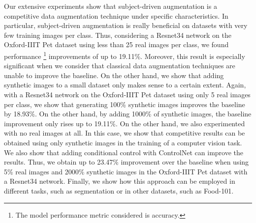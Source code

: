 Our extensive experiments show that subject-driven augmentation is a competitive data augmentation technique under specific characteristics. In particular, subject-driven augmentation is really beneficial on datasets with very few training images per class. Thus, considering a Resnet34 network on the Oxford-IIIT Pet dataset using less than 25 real images per class, we found performance \footnote{The model performance metric considered is accuracy.} improvements of up to 19.11\%. Moreover, this result is especially significant when we consider that classical data augmentation techniques are unable to improve the baseline. On the other hand, we show that adding synthetic images to a small dataset only makes sense to a certain extent. Again, with a Resnet34 network on the Oxford-IIIT Pet dataset using only 5 real images per class, we show that generating 100\% synthetic images improves the baseline by 18.93\%. On the other hand, by adding 1000\% of synthetic images, the baseline improvement only rises up to 19.11\%. On the other hand, we also experimented with no real images at all. In this case, we show that competitive results can be obtained using only synthetic images in the training of a computer vision task. We also show that adding conditional control with ControlNet can improve the results. Thus, we obtain up to 23.47\% improvement over the baseline when using 5\% real images and 2000\% synthetic images in the Oxford-IIIT Pet dataset with a Resnet34 network. Finally, we show how this approach can be employed in different tasks, such as segmentation or in other datasets, such as Food-101.